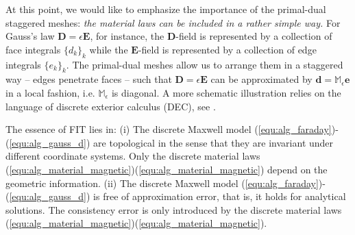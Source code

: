 \documentclass{article}
\begin{document}
At this point, we would like to emphasize the importance of the primal-dual staggered meshes: \emph{the material laws can be included in a rather simple way.} For Gauss's law $\mathbf{D} = \epsilon \mathbf{E}$, for instance, the $\mathbf{D}$-field is represented by a collection of face integrals $ \{d_k\}_{k}$ while the $\mathbf{E}$-field is represented by a collection of edge integrals $ \{e_k\}_{k}$. The primal-dual meshes allow us to arrange them in a staggered way -- edges penetrate faces -- such that $\mathbf{D} = \epsilon \mathbf{E}$ can be approximated by $\mathbf{d} = \mathbb{M}_{\epsilon}\mathbf{e}$ in a local fashion, i.e. $\mathbb{M}_{\epsilon}$ is diagonal. A more schematic illustration relies on the language of discrete exterior calculus (DEC), see \cite{bossavit1999, teixeira_1999, hip_1999}. 

The essence of FIT lies in: (i) The discrete Maxwell model (\ref{equ:alg_faraday})-(\ref{equ:alg_gauss_d}) are topological in the sense that they are invariant under different coordinate systems. Only the discrete material laws (\ref{equ:alg_material_magnetic})(\ref{equ:alg_material_magnetic}) depend on the geometric information. (ii) The discrete Maxwell model (\ref{equ:alg_faraday})-(\ref{equ:alg_gauss_d}) is free of approximation error, that is, it holds for analytical solutions. The consistency error is only introduced by the discrete material laws (\ref{equ:alg_material_magnetic})(\ref{equ:alg_material_magnetic}). 
\end{document}

